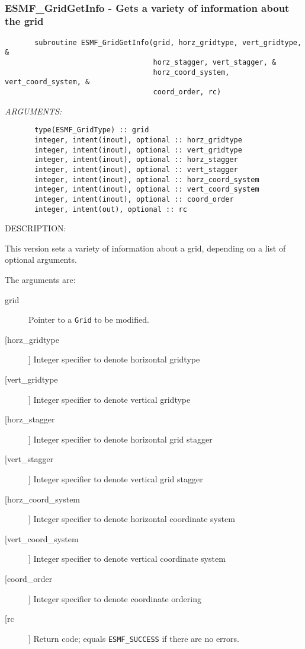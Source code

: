  
\mbox{}\hrulefill\ 
 
\subsubsection{ESMF\_GridGetInfo - Gets a variety of information about the grid}


 
\begin{verbatim}       subroutine ESMF_GridGetInfo(grid, horz_gridtype, vert_gridtype, &
                                   horz_stagger, vert_stagger, &
                                   horz_coord_system, vert_coord_system, &
                                   coord_order, rc)\end{verbatim}{\em ARGUMENTS:}
\begin{verbatim}       type(ESMF_GridType) :: grid
       integer, intent(inout), optional :: horz_gridtype
       integer, intent(inout), optional :: vert_gridtype
       integer, intent(inout), optional :: horz_stagger
       integer, intent(inout), optional :: vert_stagger
       integer, intent(inout), optional :: horz_coord_system
       integer, intent(inout), optional :: vert_coord_system
       integer, intent(inout), optional :: coord_order
       integer, intent(out), optional :: rc\end{verbatim}
{\sf DESCRIPTION:\\ }


       This version sets a variety of information about a grid, depending
       on a list of optional arguments.
  
       The arguments are:
       \begin{description}
       \item[grid]
            Pointer to a {\tt Grid} to be modified.
       \item[[horz\_gridtype]]
            Integer specifier to denote horizontal gridtype
       \item[[vert\_gridtype]]
            Integer specifier to denote vertical gridtype
       \item[[horz\_stagger]]
            Integer specifier to denote horizontal grid stagger
       \item[[vert\_stagger]]
            Integer specifier to denote vertical grid stagger
       \item[[horz\_coord\_system]]
            Integer specifier to denote horizontal coordinate system
       \item[[vert\_coord\_system]]
            Integer specifier to denote vertical coordinate system
       \item[[coord\_order]]
            Integer specifier to denote coordinate ordering
       \item[[rc]]
            Return code; equals {\tt ESMF\_SUCCESS} if there are no errors.
       \end{description}
   

